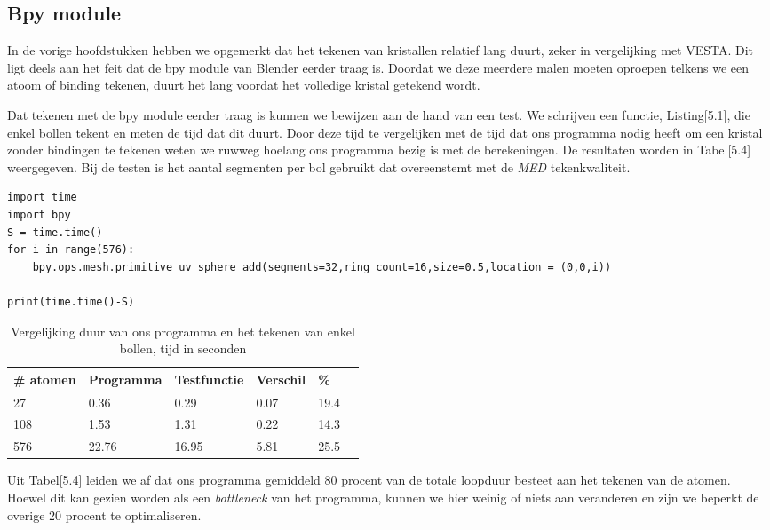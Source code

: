 \subsection{Bpy module}   
In de vorige hoofdstukken hebben we opgemerkt dat het tekenen van kristallen relatief lang duurt, zeker in vergelijking met VESTA. Dit ligt deels aan het feit dat de bpy module van Blender eerder traag is. Doordat we deze meerdere malen moeten oproepen telkens we een atoom of binding tekenen, duurt het lang voordat het volledige kristal getekend wordt.
\par
Dat tekenen met de bpy module eerder traag is kunnen we bewijzen aan de hand van een test. We schrijven een functie, Listing[5.1], die enkel bollen tekent en meten de tijd dat dit duurt. Door deze tijd te vergelijken met de tijd dat ons programma nodig heeft om een kristal zonder bindingen te tekenen weten we ruwweg hoelang ons programma bezig is met de berekeningen. De resultaten worden in Tabel[5.4] weergegeven. Bij de testen is het aantal segmenten per bol gebruikt dat overeenstemt met de \textit{MED} tekenkwaliteit.

\begin{lstlisting}[caption="Testprogramma dat een aantal bollen tekent en timed"]
import time
import bpy
S = time.time()
for i in range(576):
    bpy.ops.mesh.primitive_uv_sphere_add(segments=32,ring_count=16,size=0.5,location = (0,0,i))
    
print(time.time()-S)
\end{lstlisting}

\begin{table}[H]
\begin{center}
\begin{tabular}{|l|l|l|l|l|l|}
\hline
\# atomen & Programma 	& Testfunctie	& Verschil & \%	\\ \hline
27  & 0.36    & 0.29 		& 0.07  	&	19.4 \\ \hline
108 & 1.53   	& 1.31 		& 0.22  	&	14.3 \\ \hline
576 & 22.76 	& 16.95 	& 5.81 		&	25.5 \\ \hline
\end{tabular}
\end{center}
\caption{Vergelijking duur van ons programma en het tekenen van enkel bollen, tijd in seconden}
\end{table}

Uit Tabel[5.4] leiden we af dat ons programma gemiddeld 80 procent van de totale loopduur besteet aan het tekenen van de atomen. Hoewel dit kan gezien worden als een \textit{bottleneck} van het programma, kunnen we hier weinig of niets aan veranderen en zijn we beperkt de overige 20 procent te optimaliseren. 

